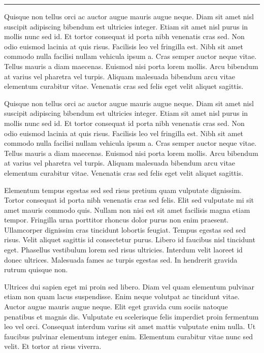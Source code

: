 \documentclass[10pt]{article}
\newenvironment{BoxedInternal}[1][]
{%
  \begin{changemargin}{0cm}{0cm}%
    \begin{mdframed}[roundcorner=5pt,backgroundcolor=swred,outermargin  =-0.5in,innermargin =-0.5in, topline=false, bottomline=false, rightline=false, leftline=false,#1]
    }{%
    \end{mdframed}%
  \end{changemargin}%
}
\newcommand*{\noind}{\setlength{\parindent}{0cm}} %
\newcommand{\bighdr}[2][]{%
  \begin{BoxedInternal}[#1]{}
    \color{white}\huge\bfseries\headingfont\filcenter{#2}
  \end{BoxedInternal}%
}
\newcommand{\medhdr}[1][]{%
	{\noind{\Large\bfseries\headingfont{#1}}}
	\vspace{-9pt}%

	\noindent\rule{2.75in}{2pt} %
}
\newcommand{\smlhdr}[1][]{%
	{\noind{\large\bfseries\headingfont{#1}}}
}
\begin{document}
\begin{multicols}{2}
\medhdr[SMALL SECTION]
{\noind
Quisque non tellus orci ac auctor augue mauris augue neque. Diam sit amet nisl suscipit adipiscing bibendum est ultricies integer. Etiam sit amet nisl purus in mollis nunc sed id. Et tortor consequat id porta nibh venenatis cras sed. Non odio euismod lacinia at quis risus. Facilisis leo vel fringilla est. Nibh sit amet commodo nulla facilisi nullam vehicula ipsum a. Cras semper auctor neque vitae. Tellus mauris a diam maecenas. Euismod nisi porta lorem mollis. Arcu bibendum at varius vel pharetra vel turpis. Aliquam malesuada bibendum arcu vitae elementum curabitur vitae. Venenatis cras sed felis eget velit aliquet sagittis.\\
}

\smlhdr[SMALLER SECTION]

{\noind
Quisque non tellus orci ac auctor augue mauris augue neque. Diam sit amet nisl suscipit adipiscing bibendum est ultricies integer. Etiam sit amet nisl purus in mollis nunc sed id. Et tortor consequat id porta nibh venenatis cras sed. Non odio euismod lacinia at quis risus. Facilisis leo vel fringilla est. Nibh sit amet commodo nulla facilisi nullam vehicula ipsum a. Cras semper auctor neque vitae. Tellus mauris a diam maecenas. Euismod nisi porta lorem mollis. Arcu bibendum at varius vel pharetra vel turpis. Aliquam malesuada bibendum arcu vitae elementum curabitur vitae. Venenatis cras sed felis eget velit aliquet sagittis.
}

\bighdr{COOL STUFF}
{\noind
Elementum tempus egestas sed sed risus pretium quam vulputate dignissim. Tortor consequat id porta nibh venenatis cras sed felis. Elit sed vulputate mi sit amet mauris commodo quis. Nullam non nisi est sit amet facilisis magna etiam tempor. Fringilla urna porttitor rhoncus dolor purus non enim praesent. Ullamcorper dignissim cras tincidunt lobortis feugiat. Tempus egestas sed sed risus. Velit aliquet sagittis id consectetur purus. Libero id faucibus nisl tincidunt eget. Phasellus vestibulum lorem sed risus ultricies. Interdum velit laoreet id donec ultrices. Malesuada fames ac turpis egestas sed. In hendrerit gravida rutrum quisque non.
}

Ultrices dui sapien eget mi proin sed libero. Diam vel quam elementum pulvinar etiam non quam lacus suspendisse. Enim neque volutpat ac tincidunt vitae. Auctor augue mauris augue neque. Elit eget gravida cum sociis natoque penatibus et magnis dis. Vulputate eu scelerisque felis imperdiet proin fermentum leo vel orci. Consequat interdum varius sit amet mattis vulputate enim nulla. Ut faucibus pulvinar elementum integer enim. Elementum curabitur vitae nunc sed velit. Et tortor at risus viverra.\\


\end{multicols}
\end{document}

